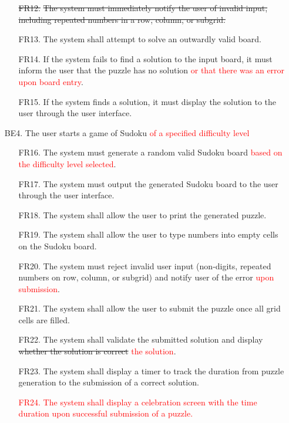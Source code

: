 \documentclass[11pt]{article}
\begin{document}
\begin{enumerate}
\begin{enumerate}
        \item [\sout{FR12.}] \sout{The system must immediately notify the user of invalid input, including repeated numbers in a row, column, or subgrid.}
        \item [FR13.] The system shall attempt to solve an outwardly valid board.
        \item [FR14.] If the system fails to find a solution to the input board, it must inform the user that the puzzle has no solution \textcolor{red}{or that there was an error upon board entry}.
        \item [FR15.] If the system finds a solution, it must display the solution to the user through the user interface.
    \end{enumerate}
    \item [BE4.] The user starts a game of Sudoku \textcolor{red}{of a specified difficulty level}
    \begin{enumerate}
        \item [FR16.] The system must generate a random valid Sudoku board  \textcolor{red}{based on the difficulty level selected}.
        \item [FR17.] The system must output the generated Sudoku board to the user through the user interface.
        \item [FR18.] The system shall allow the user to print the generated puzzle.
        \item [FR19.] The system shall allow the user to type numbers into empty cells on the Sudoku board.
        \item [FR20.] The system must reject invalid user input (non-digits, repeated numbers on row, column, or subgrid) and notify user of the error \textcolor{red}{upon submission}.
        \item [FR21.] The system shall allow the user to submit the puzzle once all grid cells are filled.
        \item [FR22.] The system shall validate the submitted solution and display \sout{whether the solution is correct} \textcolor{red}{the solution}.
        \item [FR23.] The system shall display a timer to track the duration from puzzle generation to the submission of a correct solution.
        \item [\textcolor{red}{FR24.}] \textcolor{red}{The system shall display a celebration screen with the time duration upon successful submission of a puzzle.}
    \end{enumerate}
\end{enumerate}
\end{document}
